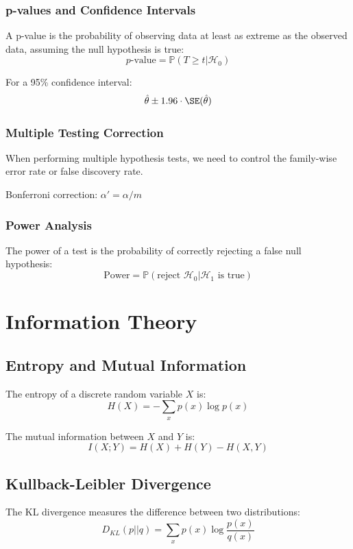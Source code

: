 \documentclass{article}
\begin{document}
\subsubsection{p-values and Confidence Intervals}

A p-value is the probability of observing data at least as extreme as
the observed data, assuming the null hypothesis is true:
\[
p\text{-value} = \mathbb{P}(T \geq t|\mathcal{H}_0)
\]

For a 95\% confidence interval:
\[
\hat{\theta} \pm 1.96 \cdot \SE(\hat{\theta})
\]

\subsubsection{Multiple Testing Correction}

When performing multiple hypothesis tests, we need to control the
family-wise error rate or false discovery rate.

Bonferroni correction: $\alpha' = \alpha / m$

\subsubsection{Power Analysis}

The power of a test is the probability of correctly rejecting a false
null hypothesis:
\[
\text{Power} = \mathbb{P}(\text{reject } \mathcal{H}_0 | \mathcal{H}_1 \text{ is true})
\]

\section{Information Theory}

\subsection{Entropy and Mutual Information}

The entropy of a discrete random variable $X$ is:
\[
H(X) = -\sum_{x} p(x) \log p(x)
\]

The mutual information between $X$ and $Y$ is:
\[
I(X;Y) = H(X) + H(Y) - H(X,Y)
\]

\subsection{Kullback-Leibler Divergence}

The KL divergence measures the difference between two distributions:
\[
D_{KL}(p||q) = \sum_x p(x) \log \frac{p(x)}{q(x)}
\]
\end{document}
